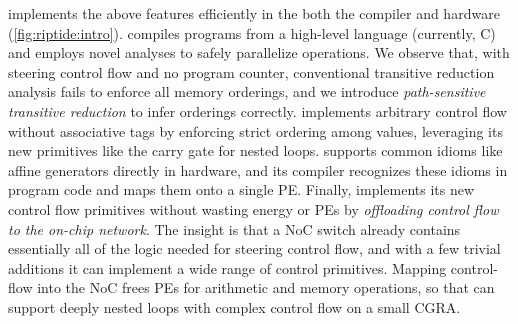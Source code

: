 \riptide implements the above features efficiently in the both
the compiler and hardware (\autoref{fig:riptide:intro}).
%
\riptide compiles programs from a high-level language (currently, C) and
employs novel analyses to safely parallelize operations.
%
We observe that, with steering control flow and no program counter,
conventional transitive reduction analysis fails to enforce all memory
orderings, and we introduce \emph{path-sensitive transitive reduction}
to infer orderings correctly.
%
\riptide implements arbitrary control flow without associative tags
by enforcing strict ordering among values,
leveraging its new primitives like the carry gate for nested loops.
%
\riptide supports common idioms like affine generators directly in hardware,
%
and its compiler recognizes these idioms in program code
and maps them onto a single PE.
%
Finally, \riptide implements its new control flow primitives without wasting energy
or PEs by \emph{offloading control flow to the on-chip network}.
%
The insight is that a NoC switch already contains essentially all of
the logic needed for steering control flow, and with a few
trivial additions it can implement a wide range of control primitives.
%
Mapping control-flow into the NoC frees PEs for arithmetic and memory
operations, so that \riptide can support deeply nested loops with complex
control flow on a small CGRA.
%

\figRipTideIntroResults

